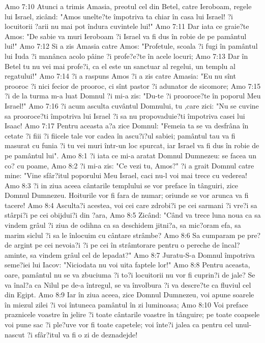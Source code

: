 Amo 7:10  Atunci a trimis Amasia, preotul cel din Betel, catre Ieroboam, regele lui Israel, zicând: "Amos unelte?te împotriva ta chiar în casa lui Israel! ?i locuitorii ?arii nu mai pot îndura cuvintele lui!"
Amo 7:11  Dar iata ce graie?te Amos: "De sabie va muri Ieroboam ?i Israel va fi dus în robie de pe pamântul lui!"
Amo 7:12  Si a zis Amasia catre Amos: "Profetule, scoala ?i fugi în pamântul lui Iuda ?i manânca acolo pâine ?i profe?e?te în acele locuri;
Amo 7:13  Dar în Betel tu nu vei mai profe?i, ca el este un sanctuar al regelui, un templu al regatului!"
Amo 7:14  ?i a raspuns Amos ?i a zis catre Amasia: "Eu nu sînt prooroc ?i nici fecior de prooroc, ci sînt pastor ?i adunator de sicomore;
Amo 7:15  ?i de la turma m-a luat Domnul ?i mi-a zis: "Du-te ?i prooroce?te în poporul Meu Israel!"
Amo 7:16  ?i acum asculta cuvântul Domnului, tu ,care zici: "Nu se cuvine sa prooroce?ti împotriva lui Israel ?i sa nu propovaduie?ti împotriva casei lui Isaac!
Amo 7:17  Pentru aceasta a?a zice Domnul: "Femeia ta se va desfrâna în cetate ?i fiii ?i fiicele tale vor cadea în ascu?i?ul sabiei; pamântul tau va fi masurat cu funia ?i tu vei muri într-un loc spurcat, iar Israel va fi dus în robie de pe pamântul lui".
Amo 8:1  ?i iata ce mi-a aratat Domnul Dumnezeu: se facea un co? cu poame,
Amo 8:2  ?i mi-a zis: "Ce vezi tu, Amos?" ?i a grait Domnul catre mine: "Vine sfâr?itul poporului Meu Israel, caci nu-l voi mai trece cu vederea!
Amo 8:3  ?i in ziua aceea cântarile templului se vor preface în tânguiri, zice Domnul Dumnezeu. Hoiturile vor fi fara de numar; oriunde se vor arunca va fi tacere!
Amo 8:4  Asculta?i acestea, voi cei care zdrobi?i pe cei sarmani ?i vre?i sa stârpi?i pe cei obijdui?i din ?ara,
Amo 8:5  Zicând: "Când va trece luna noua ca sa vindem grâul ?i ziua de odihna ca sa deschidem jitni?a, sa mic?oram efa, sa marim siclul ?i sa le înlocuim cu cântare strâmbe?
Amo 8:6  Sa cumparam pe pre? de argint pe cei nevoia?i ?i pe cei în strâmtorare pentru o pereche de încal?aminte, sa vindem grâul cel de lepadat?"
Amo 8:7  Juratu-S-a Domnul împotriva seme?iei lui Iacov: "Niciodata nu voi uita faptele lor!"
Amo 8:8  Pentru aceasta, oare, pamântul nu se va zbuciuma ?i to?i locuitorii nu vor fi cuprin?i de jale? Se va înal?a ca Nilul pe de-a întregul, se va învolbura ?i va descre?te ca fluviul cel din Egipt.
Amo 8:9  Iar în ziua aceea, zice Domnul Dumnezeu, voi apune soarele în miezul zilei ?i voi întuneca pamântul în zi luminoasa;
Amo 8:10  Voi preface praznicele voastre în jelire ?i toate cântarile voastre în tânguire; pe toate coapsele voi pune sac ?i ple?uve vor fi toate capetele; voi înte?i jalea ca pentru cel unul-nascut ?i sfâr?itul va fi o zi de deznadejde!
